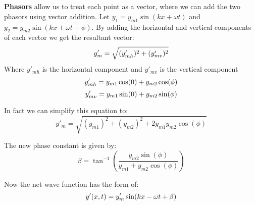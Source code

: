 \documentclass[11pt]{article}
\begin{document}
   \noindent \\ \\ \textbf{Phasors} allow us to treat each point as a vector, where we can
    add the two phasors using vector addition.
    Let $y_1 = y_{m1} \sin(kx + \omega t)$ and $y_2 = y_{m2} \sin(kx + \omega t + \phi)$.
    By adding the horizontal and vertical components of each vector we get the resultant vector:
    \begin{equation}
        y'_{m} = \sqrt{(y'_{mh})^2 + (y'_{mv})^2} \notag
    \end{equation}
    Where  $y'_{mh}$ is the horizontal component and $y'_{mv}$ is the vertical component
    \begin{equation}
        y'_{mh} = y_{m1}\cos(0) + y_{m2}\cos(\phi) \notag
    \end{equation}
    \begin{equation}
        y'_{mv} = y_{m1}\sin(0) + y_{m2}\sin(\phi) \notag
    \end{equation}

    \noindent In fact we can simplify this equation to:
    \begin{equation}
        y'_{m} = \sqrt{(y_{m1})^2 + (y_{m2})^2 + 2y_{m1}y_{m2}\cos(\phi)} \tag{net amplitude}
    \end{equation}
    
    \noindent The new phase constant is given by:
    \begin{equation}
        \beta = \tan^{-1}({\frac{y_{m2}\sin(\phi)}{y_{m1} + y_{m2} \cos(\phi)}}) \tag{net phase constant}
    \end{equation}

    \noindent Now the net wave function has the form of:
    \begin{equation}
        y'(x,t) =  y'_{m}\sin(kx - \omega t + \beta) \notag
    \end{equation}
\end{document}
